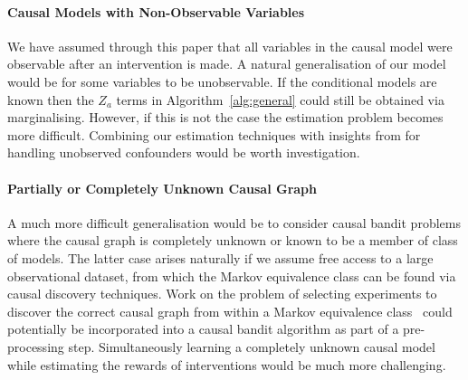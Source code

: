 \paragraph{Causal Models with Non-Observable Variables}
We have assumed through this paper that all variables in the causal model were observable after an intervention is made.
A natural generalisation of our model would be for some variables to be unobservable.
If the conditional models are known then the $Z_a$ terms in Algorithm~\ref{alg:general} could still be obtained via marginalising.
However, if this is not the case the estimation problem becomes more difficult.
Combining our estimation techniques with insights from \citet{Bareinboim2015} for handling unobserved confounders would be worth investigation.





\paragraph{Partially or Completely Unknown Causal Graph}
A much more difficult generalisation would be to consider causal bandit problems where the causal graph is completely unknown or known to be a member of class of models.
The latter case arises naturally if we assume free access to a large observational dataset, from which the Markov equivalence class can be found via causal discovery techniques. 
Work on the problem of selecting experiments to discover the correct causal graph from within a Markov equivalence class~\cite{Eberhardt2005,eberhardt2010causal,hauser2014two,Hu2014} could potentially be incorporated into a causal bandit algorithm as part of a pre-processing step.
Simultaneously learning a completely unknown causal model while estimating the rewards of interventions would be much more challenging.
	
